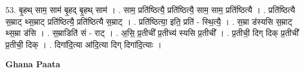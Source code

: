 \documentclass[17pt]{extarticle}
\begin{document}
53. बृ॒हथ् साम॒ साम॑ बृ॒हद् बृ॒हथ् साम॑ । . साम॒ प्रति॑ष्ठित्यै॒ प्रति॑ष्ठित्यै॒ साम॒ साम॒ प्रति॑ष्ठित्यै । . प्रति॑ष्ठित्यै स॒म्राट् थ्स॒म्राट् प्रति॑ष्ठित्यै॒ प्रति॑ष्ठित्यै स॒म्राट् । . प्रति॑ष्ठित्या॒ इति॒ प्रति॑ - स्थि॒त्यै॒ । . स॒म्रा ड॑स्यसि स॒म्राट् थ्स॒म्रा ड॑सि । . स॒म्राडिति॑ सं - राट् । . अ॒सि॒ प्र॒तीची᳚ प्र॒तीच्य॑ स्यसि प्र॒तीची᳚ । . प्र॒तीची॒ दिग् दिक् प्र॒तीची᳚ प्र॒तीची॒ दिक् । . दिगा॑दि॒त्या आ॑दि॒त्या दिग् दिगा॑दि॒त्याः । \newline

\textbf{Ghana Paata } \newline
\end{document}
